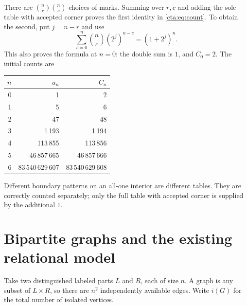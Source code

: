 \documentclass[11pt]{article}
\theoremstyle{definition}
\theoremstyle{remark}
\begin{document}
There are $\binom nr\binom nc$ choices of marks. Summing over $r,c$ and
adding the sole table with accepted corner proves the first identity
in \eqref{cta:eq:count}. To obtain the second, put $j=n-r$ and use
\[
 \sum_{c=0}^n\binom nc(2^j)^{n-c}=(1+2^j)^n.
\]
This also proves the formula at $n=0$: the double sum is $1$, and
$C_0=2$. The initial counts are
\begin{center}
\begin{tabular}{r r r}
\toprule
$n$ & $a_n$ & $C_n$\\
\midrule
0&1&2\\
1&5&6\\
2&47&48\\
3&1\,193&1\,194\\
4&113\,855&113\,856\\
5&46\,857\,665&46\,857\,666\\
6&83\,540\,629\,607&83\,540\,629\,608\\
\bottomrule
\end{tabular}
\end{center}
Different boundary patterns on an all-one interior are different tables.
They are correctly counted separately; only the full table with accepted
corner is supplied by the additional $1$.

\section{Bipartite graphs and the existing relational model}\label{cta:sec:graphs}

Take two distinguished labeled parts $L$ and $R$, each of size $n$.
A graph is any subset of $L\times R$, so there are $n^2$ independently
available edges. Write $i(G)$ for the total number of isolated vertices.
\end{document}

